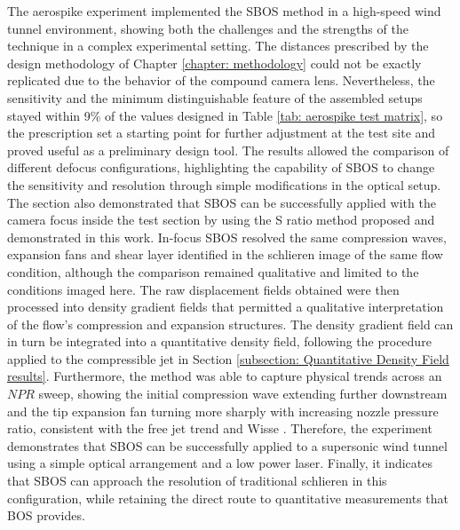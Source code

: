 The aerospike experiment implemented the SBOS method in a high-speed wind tunnel environment, showing both the challenges and the strengths of the technique in a complex experimental setting. The distances prescribed by the design methodology of Chapter \ref{chapter: methodology} could not be exactly replicated due to the behavior of the compound camera lens. Nevertheless, the sensitivity and the minimum distinguishable feature of the assembled setups stayed within 9\% of the values designed in Table \ref{tab: aerospike test matrix}, so the prescription set a starting point for further adjustment at the test site and proved useful as a preliminary design tool. The results allowed the comparison of different defocus configurations, highlighting the capability of SBOS to change the sensitivity and resolution through simple modifications in the optical setup. The section also demonstrated that SBOS can be successfully applied with the camera focus inside the test section by using the S ratio method proposed and demonstrated in this work. In-focus SBOS resolved the same compression waves, expansion fans and shear layer identified in the schlieren image of the same flow condition, although the comparison remained qualitative and limited to the conditions imaged here. The raw displacement fields obtained were then processed into density gradient fields that permitted a qualitative interpretation of the flow's compression and expansion structures. The density gradient field can in turn be integrated into a quantitative density field, following the procedure applied to the compressible jet in Section \ref{subsection: Quantitative Density Field results}. Furthermore, the method was able to capture physical trends across an $NPR$ sweep, showing the initial compression wave extending further downstream and the tip expansion fan turning more sharply with increasing nozzle pressure ratio, consistent with the free jet trend and Wisse \cite{Wisse2005}. Therefore, the experiment demonstrates that SBOS can be successfully applied to a supersonic wind tunnel using a simple optical arrangement and a low power laser. Finally, it indicates that SBOS can approach the resolution of traditional schlieren in this configuration, while retaining the direct route to quantitative measurements that BOS provides.

